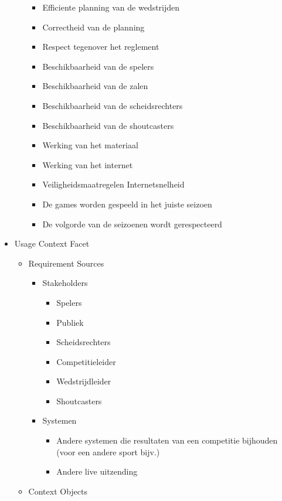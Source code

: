 \documentclass[12pt,a4paper]{article}
\begin{document}
\begin{itemize}
\begin{itemize}
				\begin{itemize}
					\item Efficiente planning van de wedstrijden
					\item Correctheid van de planning
					\item Respect tegenover het reglement
					\item Beschikbaarheid van de spelers
					\item Beschikbaarheid van de zalen
					\item Beschikbaarheid van de scheidsrechters
					\item Beschikbaarheid van de shoutcasters
					\item Werking van het materiaal
					\item Werking van het internet
					\item Veiligheidsmaatregelen
					\Item Internetsnelheid
					\item De games worden gespeeld in het juiste seizoen
					\item De volgorde van de seizoenen wordt gerespecteerd
				\end{itemize}
			\end{itemize}
			\item Usage Context Facet
			\begin{itemize}
				\item Requirement Sources
				\begin{itemize}
					\item Stakeholders
					\begin{itemize}
						\item Spelers
						\item Publiek
						\item Scheidsrechters
						\item Competitieleider
						\item Wedstrijdleider
						\item Shoutcasters
					\end{itemize}
					\item Systemen
					\begin{itemize}
						\item Andere systemen die resultaten van een competitie bijhouden (voor een andere sport bijv.)
						\item Andere live uitzending
					\end{itemize}
				\end{itemize}
				\item Context Objects
				\begin{itemize}

\end{itemize}
\end{itemize}
\end{itemize}
\end{document}
